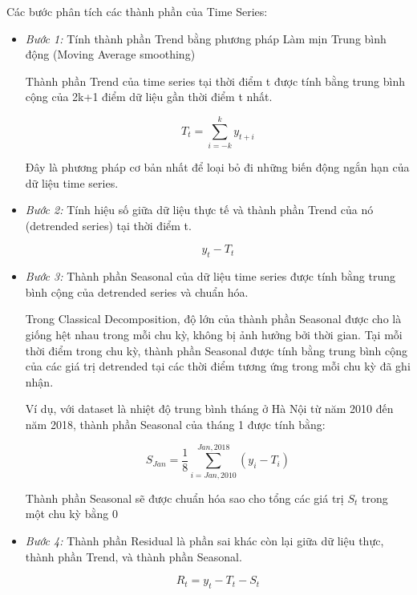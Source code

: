 \documentclass[12pt]{article}
\begin{document}
        Các bước phân tích các thành phần của Time Series:
        \begin{itemize}
            \item \textit{Bước 1:} Tính thành phần Trend bằng phương pháp Làm mịn Trung bình động (Moving Average smoothing)
            
            Thành phần Trend của time series tại thời điểm t được tính bằng trung bình cộng của 2k+1 điểm dữ liệu gần thời điểm t nhất.
            
            $$
            T_t = \sum_{i=-k}^{k} y_{t+i}
            $$
            
            Đây là phương pháp cơ bản nhất để loại bỏ đi những biến động ngắn hạn của dữ liệu time series.
            
            \item \textit{Bước 2:} Tính hiệu số giữa dữ liệu thực tế và thành phần Trend của nó (detrended series) tại thời điểm t.
            
            $$
            y_t - T_t
            $$
            
            \item \textit{Bước 3:} Thành phần Seasonal của dữ liệu time series được tính bằng trung bình cộng của detrended series và chuẩn hóa.
            
            Trong Classical Decomposition, độ lớn của thành phần Seasonal được cho là giống hệt nhau trong mỗi chu kỳ, không bị ảnh hưởng bởi thời gian. Tại mỗi thời điểm trong chu kỳ, thành phần Seasonal được tính bằng trung bình cộng của các giá trị detrended tại các thời điểm tương ứng trong mỗi chu kỳ đã ghi nhận.
            
            Ví dụ, với dataset là nhiệt độ trung bình tháng ở Hà Nội từ năm 2010 đến năm 2018, thành phần Seasonal của tháng 1 được tính bằng:
            
            $$
            S_{Jan} = \frac{1}{8} \sum_{i = Jan, 2010}^{Jan,2018} (y_i - T_i)
            $$
            
            Thành phần Seasonal sẽ được chuẩn hóa sao cho tổng các giá trị $S_t$ trong một chu kỳ bằng 0
            
            \item \textit{Bước 4:} Thành phần Residual là phần sai khác còn lại giữa dữ liệu thực, thành phần Trend, và thành phần Seasonal.
            
            $$
            R_t = y_t - T_t - S_t
            $$
            
        \end{itemize}
        
\end{document}
